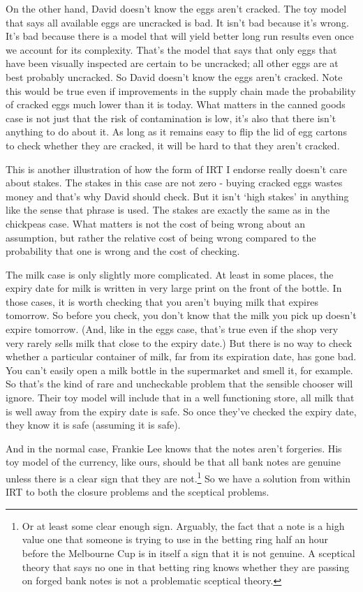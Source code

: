 \documentclass[
  10pt,
  letterpaper,
  twoside]{scrbook}
\begin{document}
On the other hand, David doesn't know the eggs aren't cracked. The toy
model that says all available eggs are uncracked is bad. It isn't bad
because it's wrong. It's bad because there is a model that will yield
better long run results even once we account for its complexity. That's
the model that says that only eggs that have been visually inspected are
certain to be uncracked; all other eggs are at best probably uncracked.
So David doesn't know the eggs aren't cracked. Note this would be true
even if improvements in the supply chain made the probability of cracked
eggs much lower than it is today. What matters in the canned goods case
is not just that the risk of contamination is low, it's also that there
isn't anything to do about it. As long as it remains easy to flip the
lid of egg cartons to check whether they are cracked, it will be hard to
that they aren't cracked.

This is another illustration of how the form of IRT I endorse really
doesn't care about stakes. The stakes in this case are not zero - buying
cracked eggs wastes money and that's why David should check. But it
isn't `high stakes' in anything like the sense that phrase is used. The
stakes are exactly the same as in the chickpeas case. What matters is
not the cost of being wrong about an assumption, but rather the relative
cost of being wrong compared to the probability that one is wrong and
the cost of checking.

The milk case is only slightly more complicated. At least in some
places, the expiry date for milk is written in very large print on the
front of the bottle. In those cases, it is worth checking that you
aren't buying milk that expires tomorrow. So before you check, you don't
know that the milk you pick up doesn't expire tomorrow. (And, like in
the eggs case, that's true even if the shop very very rarely sells milk
that close to the expiry date.) But there is no way to check whether a
particular container of milk, far from its expiration date, has gone
bad. You can't easily open a milk bottle in the supermarket and smell
it, for example. So that's the kind of rare and uncheckable problem that
the sensible chooser will ignore. Their toy model will include that in a
well functioning store, all milk that is well away from the expiry date
is safe. So once they've checked the expiry date, they know it is safe
(assuming it is safe).

And in the normal case, Frankie Lee knows that the notes aren't
forgeries. His toy model of the currency, like ours, should be that all
bank notes are genuine unless there is a clear sign that they are
not.\footnote{Or at least some clear enough sign. Arguably, the fact
  that a note is a high value one that someone is trying to use in the
  betting ring half an hour before the Melbourne Cup is in itself a sign
  that it is not genuine. A sceptical theory that says no one in that
  betting ring knows whether they are passing on forged bank notes is
  not a problematic sceptical theory.} So we have a solution from within
IRT to both the closure problems and the sceptical problems.
\end{document}
